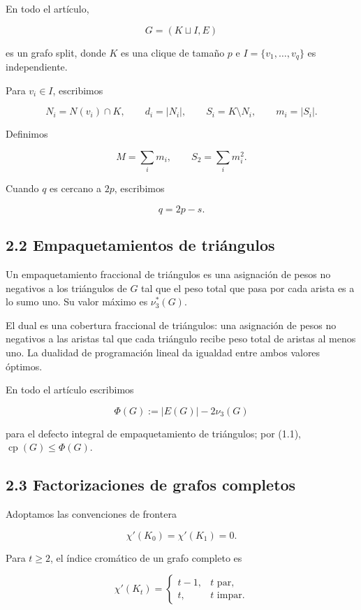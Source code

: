 \documentclass[
  11pt,
]{article}
\begin{document}
En todo el artículo,

\[
G=(K\sqcup I,E)
\]

es un grafo split, donde \(K\) es una clique de tamaño \(p\) e \(I=\{v_1,\ldots,v_q\}\) es independiente.

Para \(v_i\in I\), escribimos

\[
N_i=N(v_i)\cap K,
\qquad
d_i=|N_i|,
\qquad
S_i=K\setminus N_i,
\qquad
m_i=|S_i|.
\]

Definimos

\[
M=\sum_i m_i,
\qquad
S_2=\sum_i m_i^2.
\]

Cuando \(q\) es cercano a \(2p\), escribimos

\[
q=2p-s.
\tag{2.1}
\]

\subsection{2.2 Empaquetamientos de triángulos}\label{empaquetamientos-de-triuxe1ngulos}

Un empaquetamiento fraccional de triángulos es una asignación de pesos no negativos a los triángulos de \(G\) tal que el peso total que pasa por cada arista es a lo sumo uno. Su valor máximo es \(\nu_3^*(G)\).

El dual es una cobertura fraccional de triángulos: una asignación de pesos no negativos a las aristas tal que cada triángulo recibe peso total de aristas al menos uno. La dualidad de programación lineal da igualdad entre ambos valores óptimos.

En todo el artículo escribimos

\[
\Phi(G):=|E(G)|-2\nu_3(G)
\]

para el defecto integral de empaquetamiento de triángulos; por (1.1), \(\operatorname{cp}(G)\le\Phi(G)\).

\subsection{2.3 Factorizaciones de grafos completos}\label{factorizaciones-de-grafos-completos}

Adoptamos las convenciones de frontera

\[
\chi'(K_0)=\chi'(K_1)=0.
\]

Para \(t\ge2\), el índice cromático de un grafo completo es

\[
\chi'(K_t)
=
\begin{cases}
t-1,&t\text{ par},\\
t,&t\text{ impar}.
\end{cases}
\tag{2.2}
\]
\end{document}
